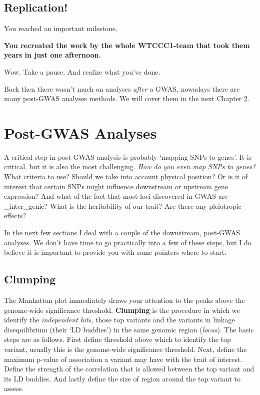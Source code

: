 \documentclass[
]{book}
\begin{document}
\hypertarget{replication}{%
\section{Replication!}\label{replication}}

You reached an important milestone.

\textbf{You recreated the work by the whole WTCCC1-team that took them years in just one afternoon.}

Wow. Take a pause. And realize what you've done.

Back then there wasn't much on analyses \emph{after} a GWAS, nowadays there are many post-GWAS analyses methods. We will cover them in the next Chapter \ref{post-gwas}.

\hypertarget{post-gwas}{%
\chapter{Post-GWAS Analyses}\label{post-gwas}}

A critical step in post-GWAS analysis is probably `mapping SNPs to genes'. It is critical, but it is also the most challenging. \emph{How do you even map SNPs to genes?} What criteria to use? Should we take into account physical position? Or is it of interest that certain SNPs might influence downstream or upstream gene expression? And what of the fact that most loci discovered in GWAS are \_inter\_genic? What is the heritability of our trait? Are there any pleiotropic effects?

In the next few sections I deal with a couple of the downstream, post-GWAS analyses. We don't have time to go practically into a few of these steps, but I do believe it is important to provide you with some pointers where to start.

\hypertarget{clumping}{%
\section{Clumping}\label{clumping}}

The Manhattan plot immediately draws your attention to the peaks above the genome-wide significance threshold. \textbf{Clumping} is the procedure in which we identify the \emph{independent hits}, those top variants and the variants in linkage disequilibrium (their `LD buddies') in the same genomic region (\emph{locus}). The basic steps are as follows. First define threshold above which to identify the top variant, usually this is the genome-wide significance threshold. Next, define the maximum p-value of association a variant may have with the trait of interest. Define the strength of the correlation that is allowed between the top variant and its LD buddies. And lastly define the size of region around the top variant to assess.
\end{document}

